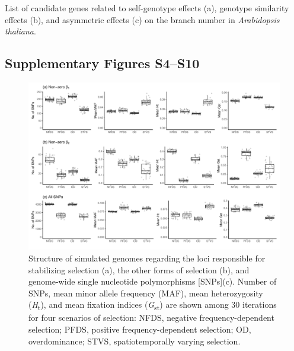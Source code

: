 \documentclass[12pt,]{article}
\begin{document}
\medskip
\noindent
\begin{table}[ht]
\caption{List of candidate genes related to self-genotype effects (a), genotype similarity effects (b), and asymmetric effects (c) on the branch number in \textit{Arabidopsis thaliana}.}
    \label{tableS4:GWAScandidates}
\end{table}


\newpage
\subsection*{Supplementary Figures S4--S10}

\begin{figure}[ht]
  \includegraphics[width=\linewidth]{SimGenomeSummary.pdf}
  \caption{Structure of simulated genomes regarding the loci responsible for stabilizing selection (a), the other forms of selection (b), and genome-wide single nucleotide polymorphisms [SNPs](c). Number of SNPs, mean minor allele frequency (MAF), mean heterozygosity (\textit{H}\textsubscript{t}), and mean fixation indices (\textit{G}\textsubscript{st}) are shown among 30 iterations for four scenarios of selection: NFDS, negative frequency-dependent selection; PFDS, positive frequency-dependent selection; OD, overdominance; STVS, spatiotemporally varying selection.}
  \label{figS4:GenStr}
\end{figure}
\end{document}
